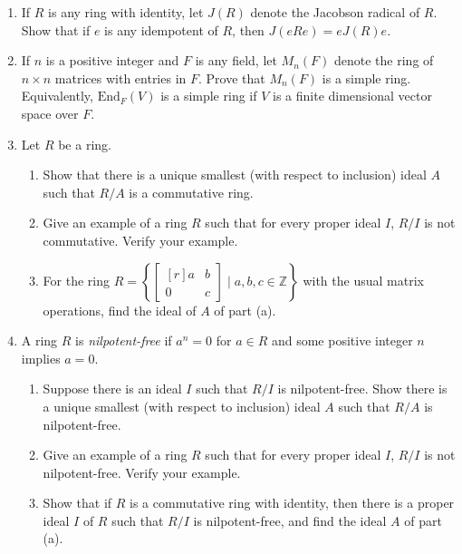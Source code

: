 \documentclass{article}
\theoremstyle{definition}
\newcommand{\Z}{\mathbb{Z}}
\newcommand{\mat}[1]{\begin{bmatrix*}[r] #1 \end{bmatrix*}}
\newcommand{\x}{\times}
\newcommand{\set}[1]{\left\{#1\right\}}
\begin{document}
\begin{enumerate}
            \item If $R$ is any ring with identity, let $J(R)$ denote the Jacobson radical of $R$. Show that if $e$ is any idempotent of $R$, then $J(eRe)=eJ(R)e$.
            
            \item If $n$ is a positive integer and $F$ is any field, let $M_n(F)$ denote the ring of $n\x n$ matrices with entries in $F$. Prove that $M_n(F)$ is a simple ring. Equivalently, $\text{End}_F(V)$ is a simple ring if $V$ is a finite dimensional vector space over $F$.
            
            \item Let $R$ be a ring.
            
            \begin{enumerate}
                \item Show that there is a unique smallest (with respect to inclusion) ideal $A$ such that $R/A$ is a commutative ring.
                \item Give an example of a ring $R$ such that for every proper ideal $I$, $R/I$ is not commutative. Verify your example.
                \item For the ring $R=\set{\mat{a&b\\0&c} \mid a,b,c\in \Z}$ with the usual matrix operations, find the ideal of $A$ of part (a).
            \end{enumerate}

            \item A ring $R$ is \textit{nilpotent-free} if $a^n=0$ for $a\in R$ and some positive integer $n$ implies $a=0$.
            
            \begin{enumerate}
                \item Suppose there is an ideal $I$ such that $R/I$ is nilpotent-free. Show there is a unique smallest (with respect to inclusion) ideal $A$ such that $R/A$ is nilpotent-free.
                \item Give an example of a ring $R$ such that for every proper ideal $I$, $R/I$ is not nilpotent-free. Verify your example.
                \item Show that if $R$ is a commutative ring with identity, then there is a proper ideal $I$ of $R$ such that $R/I$ is nilpotent-free, and find the ideal $A$ of part (a).
            \end{enumerate}
            

\end{enumerate}
\end{document}
